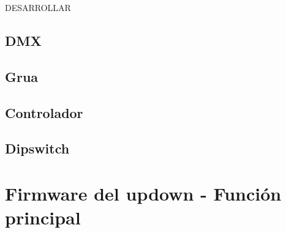 \textcolor{FIXME}{DESARROLLAR}

\subsection{DMX}

\subsection{Grua}

\subsection{Controlador}

\subsection{Dipswitch}


\section{Firmware del updown - Función principal} \label{sec:\thesection}



